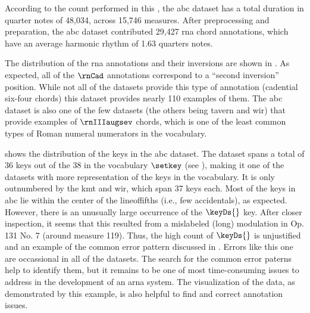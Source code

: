 
According to the count performed in this \thesisdiss{}, the
\gls{abc} dataset has a total duration in quarter notes of
48,034, across 15,746 measures. After preprocessing and
preparation, the \gls{abc} dataset contributed 29,427
\gls{rna} chord annotations, which have an average harmonic
rhythm of 1.63 \glspl{quarter} notes.

The distribution of the \gls{rna} annotations and their
inversions are shown in . As
expected, all of the $\rnCad$ annotations correspond to a
``second inversion'' position. While not all of the datasets
provide this type of annotation (cadential six-four chords)
this dataset provides nearly 110 examples of them. The
\gls{abc} dataset is also one of the few datasets (the
others being \gls{tavern} and \gls{wir}) that provide
examples of $\rnIIIaugsev$ chords, which is one of the least
common types of Roman numeral numerators in the vocabulary.



 shows the distribution of the keys
in the \gls{abc} dataset. The dataset spans a total of 36
keys out of the 38 in the vocabulary $\setkey$ (see
), making it one of the
datasets with more representation of the keys in the
vocabulary. It is only outnumbered by the \gls{kmt} and
\gls{wir}, which span 37 keys each. Most of the keys in
\gls{abc} lie within the center of the \gls{lineoffifths}
(i.e., few accidentals), as expected. However, there is an
unusually large occurrence of the $\keyDs{}$ key. After
closer inspection, it seems that this resulted from a
mislabeled (long) modulation in Op. 131 No. 7 (around
measure 119). Thus, the high count of $\keyDs{}$ is
unjustified and an example of the common error pattern
discussed in
.
Errors like this one are occassional in all of the datasets.
The search for the common error paterns help to identify
them, but it remains to be one of most time-consuming issues
to address in the development of an \gls{arna} system. The
visualization of the data, as demonstrated by this example,
is also helpful to find and correct annotation issues.


